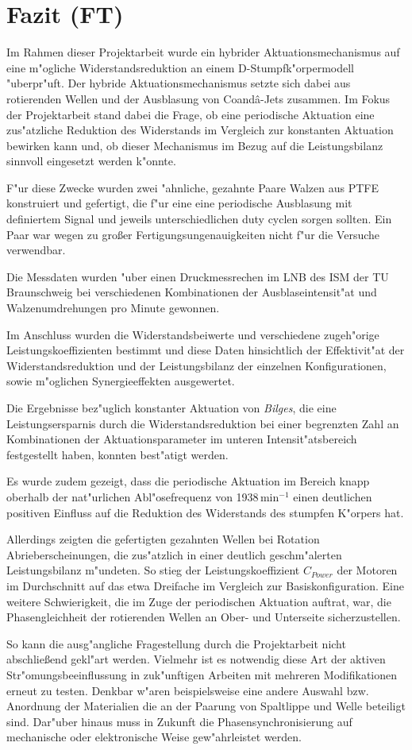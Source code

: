 \chapter{Fazit (FT)}\label{s:fazit}
Im Rahmen dieser Projektarbeit wurde ein hybrider Aktuationsmechanismus auf eine m"ogliche Widerstandsreduktion an einem D-Stumpfk"orpermodell "uberpr"uft.
Der hybride Aktuationsmechanismus setzte sich dabei aus rotierenden Wellen und der Ausblasung von Coand\^{a}-Jets zusammen.
Im Fokus der Projektarbeit stand dabei die Frage, ob eine periodische Aktuation eine zus"atzliche Reduktion des Widerstands im Vergleich zur konstanten Aktuation bewirken kann und, ob dieser Mechanismus im Bezug auf die Leistungsbilanz sinnvoll eingesetzt werden k"onnte.

F"ur diese Zwecke wurden zwei "ahnliche, gezahnte Paare Walzen aus PTFE konstruiert und gefertigt, die f"ur eine eine periodische Ausblasung mit definiertem Signal und jeweils unterschiedlichen duty cyclen sorgen sollten. Ein Paar war wegen zu gro\ss{}er Fertigungsungenauigkeiten nicht f"ur die Versuche verwendbar.

Die Messdaten wurden "uber einen Druckmessrechen im LNB des ISM der TU Braunschweig bei verschiedenen Kombinationen der Ausblaseintensit"at und Walzenumdrehungen pro Minute gewonnen.

Im Anschluss wurden die Widerstandsbeiwerte  und verschiedene zugeh"orige Leistungskoeffizienten bestimmt und diese Daten hinsichtlich der Effektivit"at der Widerstandsreduktion und der Leistungsbilanz der einzelnen Konfigurationen, sowie m"oglichen Synergieeffekten ausgewertet.

Die Ergebnisse bez"uglich konstanter Aktuation von \textit{Bilges}, die eine Leistungsersparnis durch die Widerstandsreduktion bei einer begrenzten Zahl an Kombinationen der Aktuationsparameter im unteren Intensit"atsbereich festgestellt haben, konnten best"atigt werden. 

Es wurde zudem gezeigt, dass die periodische Aktuation im Bereich knapp oberhalb der nat"urlichen Abl"osefrequenz von 1938\,$\mathrm{min^{-1}}$ einen deutlichen positiven Einfluss auf die Reduktion des Widerstands des stumpfen K"orpers hat.

Allerdings zeigten die gefertigten gezahnten Wellen bei Rotation Abrieberscheinungen, die zus"atzlich in einer deutlich geschm"alerten  Leistungsbilanz m"undeten.
So stieg der Leistungskoeffizient $C_{Power}$ der Motoren  im Durchschnitt auf das etwa Dreifache im Vergleich zur Basiskonfiguration.
Eine weitere Schwierigkeit, die im Zuge der periodischen Aktuation auftrat, war, die Phasengleichheit der rotierenden Wellen an Ober- und Unterseite sicherzustellen.

So kann die ausg"angliche Fragestellung durch die Projektarbeit nicht abschlie\ss{}end gekl"art werden. Vielmehr ist es notwendig diese Art der aktiven Str"omungsbeeinflussung in zuk"unftigen Arbeiten mit mehreren Modifikationen erneut zu testen. Denkbar w"aren beispielsweise eine andere Auswahl bzw. Anordnung der  Materialien die an der Paarung von Spaltlippe und Welle beteiligt sind. Dar"uber hinaus muss in Zukunft die Phasensynchronisierung auf mechanische oder elektronische Weise gew"ahrleistet werden.